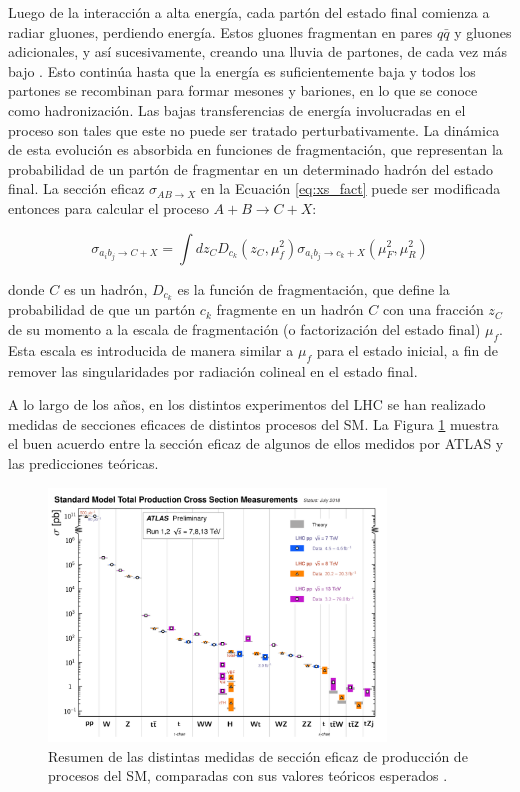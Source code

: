 Luego de la interacción a alta energía, cada partón del estado final comienza a radiar gluones,
perdiendo energía. Estos gluones fragmentan en pares $q\bar{q}$ y gluones adicionales, y así sucesivamente, creando una lluvia de partones, de cada vez más bajo \pt. Esto continúa hasta
que la energía es suficientemente baja y todos los partones se recombinan para formar
mesones y bariones, en lo que se conoce como hadronización. Las bajas transferencias de
energía involucradas en el proceso son tales que este no puede ser tratado perturbativamente. La dinámica de esta evolución es absorbida en funciones de fragmentación, que
representan la probabilidad de un partón de fragmentar en un determinado hadrón del
estado final. La sección eficaz $\sigma_{AB\to X}$ en la Ecuación \ref{eq:xs_fact} puede ser modificada entonces para
calcular el proceso $A + B \to C + X$:

\begin{equation}
	\sigma_{a_i b_j \to C+X} = \int dz_{C} D_{c_k}(z_C, \mu_{f}^2) \sigma_{a_i b_j \to c_k + X}(\mu_{F}^2, \mu_{R}^2)
\end{equation}

donde $C$ es un hadrón, $D_{c_k}$ es la función de fragmentación, que define la probabilidad
de que un partón $c_k$ fragmente en un hadrón $C$ con una fracción $z_C$ de su momento a la
escala de fragmentación (o factorización del estado final) $\mu_{f}$. Esta escala es introducida
de manera similar a $\mu_{f}$ para el estado inicial, a fin de remover las singularidades por
radiación colineal en el estado final.

A lo largo de los años, en los distintos experimentos del LHC se han realizado medidas de secciones eficaces de distintos procesos del SM. La Figura \ref{fig:sm_xs} muestra el buen acuerdo entre la sección eficaz de algunos de ellos medidos por ATLAS y las predicciones teóricas.

\begin{figure}
	\centering
  \includegraphics[width=0.8\textwidth]{images/ATLAS_a_SMSummary_TotalXsect.pdf}
  \caption{Resumen de las distintas medidas de sección eficaz de producción de procesos del SM, comparadas con sus valores teóricos esperados \cite{sm_xs}.}
  \label{fig:sm_xs}
\end{figure}







